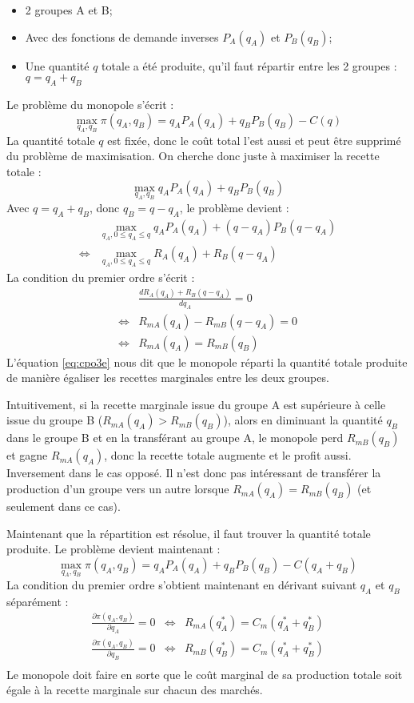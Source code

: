 \documentclass[
]{book}
\providecommand{\tightlist}{%
  \setlength{\itemsep}{0pt}\setlength{\parskip}{0pt}}
\theoremstyle{definition}
\theoremstyle{definition}
\theoremstyle{definition}
\theoremstyle{definition}
\theoremstyle{remark}
\begin{document}
\begin{itemize}
\tightlist
\item
  2 groupes A et B;
\item
  Avec des fonctions de demande inverses \(P_A(q_A)\) et \(P_B(q_B)\);
\item
  Une quantité \(q\) totale a été produite, qu'il faut répartir entre les 2 groupes : \(q=q_A+q_B\)
\end{itemize}

Le problème du monopole s'écrit :
\[
\max_{q_A, q_B} \pi(q_A, q_B) = q_AP_A(q_A) + q_BP_B(q_B) -C(q)
\]
La quantité totale \(q\) est fixée, donc le coût total l'est aussi et peut être supprimé du problème de maximisation.
On cherche donc juste à maximiser la recette totale :
\[
\max_{q_A, q_B} q_AP_A(q_A) + q_BP_B(q_B) 
\]
Avec \(q=q_A+q_B\), donc \(q_B=q-q_A\), le problème devient :
\[
\begin{array}{rl}
&\max_{q_A, 0\leq q_A\leq q} q_AP_A(q_A) + (q-q_A)P_B(q-q_A) \\
\Leftrightarrow &\max_{q_A, 0\leq q_A\leq q} R_A(q_A) + R_B(q-q_A) 
\end{array}
\]
La condition du premier ordre s'écrit :
\[
\begin{array}{rl}
&\frac{dR_A(q_A) + R_B(q-q_A) }{dq_A} = 0\\
\Leftrightarrow & R_{mA}(q_A) - R_{mB}(q-q_A) = 0\\
\Leftrightarrow & R_{mA}(q_A) = R_{mB}(q_B) 
\label{eq:cpo3e}
\end{array}
\]
L'équation \eqref{eq:cpo3e} nous dit que le monopole réparti la quantité totale produite de manière égaliser les recettes marginales entre les deux groupes.

Intuitivement, si la recette marginale issue du groupe A est supérieure à celle issue du groupe B (\(R_{mA}(q_A) > R_{mB}(q_B)\)), alors en diminuant la quantité \(q_B\) dans le groupe B et en la transférant au groupe A, le monopole perd \(R_{mB}(q_B)\) et gagne \(R_{mA}(q_A)\), donc la recette totale augmente et le profit aussi.
Inversement dans le cas opposé.
Il n'est donc pas intéressant de transférer la production d'un groupe vers un autre lorsque \(R_{mA}(q_A) = R_{mB}(q_B)\) (et seulement dans ce cas).

Maintenant que la répartition est résolue, il faut trouver la quantité totale produite.
Le problème devient maintenant :
\[
\max_{q_A, q_B} \pi(q_A, q_B) = q_AP_A(q_A) + q_BP_B(q_B) -C(q_A+q_B)
\]
La condition du premier ordre s'obtient maintenant en dérivant suivant \(q_A\) et \(q_B\) séparément :
\[
\begin{array}{rcl}
\frac{\partial\pi(q_A, q_B)}{\partial q_A} = 0&\Leftrightarrow& R_{mA}(q_A^*) = C_m(q_A^*+q_B^*)\\
\frac{\partial\pi(q_A, q_B)}{\partial q_B} = 0&\Leftrightarrow& R_{mB}(q_B^*) = C_m(q_A^*+q_B^*)\\
\end{array}
\]
Le monopole doit faire en sorte que le coût marginal de sa production totale soit égale à la recette marginale sur chacun des marchés.
\end{document}
